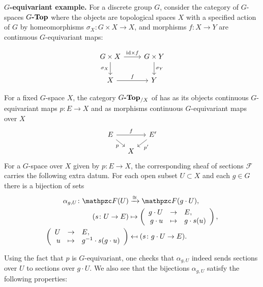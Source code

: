 \begin{nameless}\textbf{$G$-equivariant example.}
  \label{obs:G-equivariant-sheaf-of-sections}
  For a discrete group $G$, consider the category of $G$-spaces $G\text{\bf -Top}$
  where the objects are topological spaces $X$ with a specified action of $G$ by
  homeomorphisms $\sigma_X\colon G\times X\to X$, and morphisms $f\colon X\to Y$
  are continuous $G$-equivariant maps:

  \[ \begin{tikzcd}
      G\times X\ar{r}{\idid\times f}\ar{d}[swap]{\sigma_X} & G\times Y\ar{d}{\sigma_Y} \\
      X\ar{r}{f} & Y
    \end{tikzcd} \]

  For a fixed $G$-space $X$, the category $G\text{\bf -Top}_{/X}$ of
   has as its objects continuous $G$-equivariant maps
  $p\colon E\to X$ and as morphisms continuous $G$-equivariant maps over $X$
  \[ \begin{tikzcd}[row sep=small, column sep=small]
      E\ar{rr}{f}\ar{dr}[swap]{p} && E'\ar{dl}{p'} \\
      & X
    \end{tikzcd} \]
  For a $G$-space over $X$ given by $p\colon E\to X$, the corresponding sheaf of
  sections $\mathcal{F}$ carries the following extra datum. For each open subset
  $U \subset X$ and each $g\in G$ there is a bijection of sets
  \begin{align*}
    \alpha_{g,U}\colon \mathcal{F} (U) & \xrightarrow{\isom} \mathcal{F} (g\cdot U), \\
    (s\colon U\to E) & \mapsto \left(\begin{array}{rcl}
                                       g\cdot U & \to & E,\\
                                       g\cdot u & \mapsto & g\cdot s (u)
                                     \end{array}\right),\\
    \left(\begin{array}{rcl}
            U & \to & E, \\
            u & \mapsto & g^{-1}\cdot s (g\cdot u)
          \end{array}\right) & \mapsfrom (s\colon g\cdot U\to E).
  \end{align*}

  Using the fact that $p$ is $G$-equivariant, one checks that $\alpha_{g,U}$
  indeed sends sections over $U$ to sections over $g\cdot U$. We also see that
  the bijections $\alpha_{g,U}$ satisfy the following properties:


\end{nameless}
